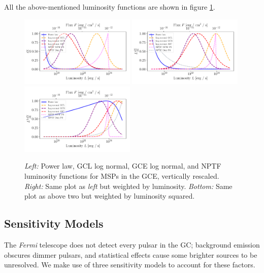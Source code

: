 \documentclass[a4paper,11pt]{article}
\begin{document}
All the above-mentioned luminosity functions are shown in figure \ref{fig:lum-funcs}.

\begin{figure}
    \centering
    \includegraphics[width=0.49\textwidth]{figs/lum-funcs.pdf}
    \includegraphics[width=0.49\textwidth]{figs/l-lum-funcs.pdf}
    \includegraphics[width=0.49\textwidth]{figs/l2-lum-funcs.pdf}
    \caption{\textit{Left:} Power law, GCL log normal, GCE log normal, and NPTF luminosity functions for MSPs in the GCE, vertically rescaled. \textit{Right:} Same plot as \textit{left} but weighted by luminosity. \textit{Bottom:} Same plot as above two but weighted by luminosity squared.}
    \label{fig:lum-funcs}
\end{figure}


\subsection{Sensitivity Models}
\label{sec:sensitivity}
The \textit{Fermi} telescope does not detect every pulsar in the GC; background emission obscures dimmer pulsars, and statistical effects cause some brighter sources to be unresolved. We make use of three sensitivity models to account for these factors.
\end{document}
